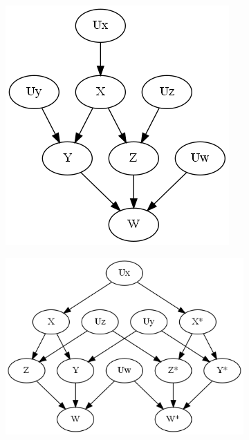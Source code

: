 \begin{figure}
	\centering			
	\begin{subfigure}{0.49\linewidth}
		\centering
		\includegraphics[width=0.7\linewidth]{./images/Chapter 2/count-tn-1.png}
		\caption{}
		\label{fig:count-tn-a}
	\end{subfigure}
	\begin{subfigure}{0.49\linewidth}
		\centering
		\includegraphics[width=\linewidth]{./images/Chapter 2/count-tn-2.png}
		\caption{}
		\label{fig:count-tn-b}
	\end{subfigure}
	\begin{subfigure}{0.49\linewidth}
		\centering

\end{subfigure}
\end{figure}
